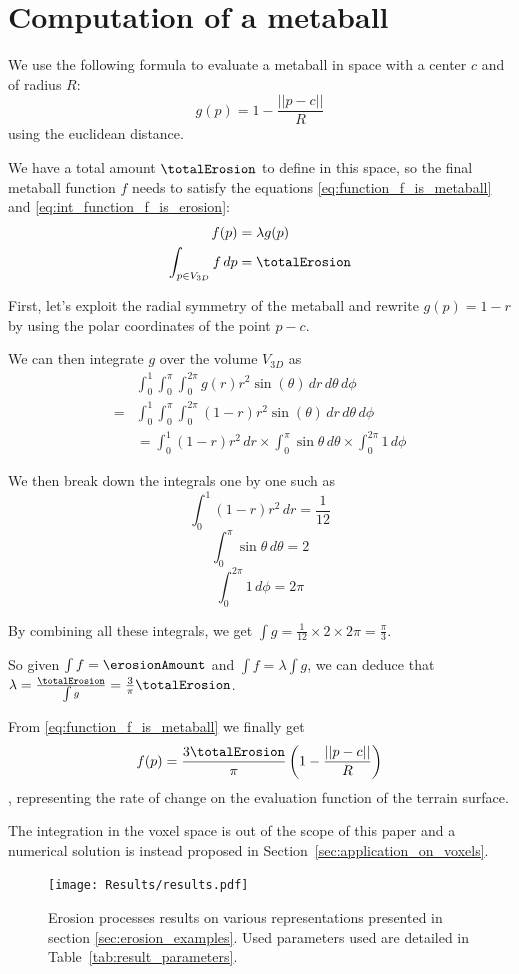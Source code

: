 %
\section{Computation of a metaball}
\label{sec:appendix_metaball}
We use the following formula to evaluate a metaball in space with a center $c$ and of radius $R$:
$$ g(p) = 1 - \frac{||p - c||}{R} $$
using the euclidean distance.

We have a total amount $\totalErosion$ to define in this space, so the final metaball function $f$ needs to satisfy the equations \eqref{eq:function_f_is_metaball} and \eqref{eq:int_function_f_is_erosion}:
\begin{align}
\label{eq:function_f_is_metaball}
f(p) &= \lambda g(p) \\
\label{eq:int_function_f_is_erosion}
\int_{p \in V_{3D}}{f \, dp} &= \totalErosion
\end{align}

First, let's exploit the radial symmetry of the metaball and rewrite $g(p) = 1 - r$ by using the polar coordinates of the point $p - c$.

We can then integrate $g$ over the volume $V_{3D}$ as 
\begin{align}
&\int_{0}^{1}{ \int_{0}^{\pi}{ \int_{0}^{2\pi}{ g(r) r^2 \sin(\theta)\, dr} \, d\theta} \, d\phi} \nonumber \\
= &\int_{0}^{1}{ \int_{0}^{\pi}{ \int_{0}^{2\pi}{ (1 - r) r^2 \sin(\theta)\, dr} \, d\theta} \, d\phi} \nonumber \\
&= \int_{0}^{1}{ (1 - r)r^2 \, dr} \times \int_{0}^{\pi}{ \sin{\theta} \, d\theta } \times \int_{0}^{2\pi}{ 1 \, d\phi} \nonumber
\end{align}

We then break down the integrals one by one such as 
$$ \int_{0}^{1}{ (1 - r)r^2 \, dr} = \frac{1}{12} \nonumber$$ 
$$ \int_{0}^{\pi}{ \sin{\theta} \, d\theta } = 2 \nonumber$$ 
$$ \int_{0}^{2\pi}{ 1 \, d\phi} = 2 \pi \nonumber$$

By combining all these integrals, we get $\int{g} = \frac{1}{12} \times 2 \times 2\pi = \frac{\pi}{3}$.

So given $\int{f} = \erosionAmount$ and $\int{f} = \lambda \int{g}$, we can deduce that $\lambda = \frac{\totalErosion}{\int{g}} = \frac{3}{\pi}\totalErosion$.

From \eqref{eq:function_f_is_metaball} we finally get 
\begin{align} 
\label{eq:proofErosionMetaball}
f(p) = \frac{3 \totalErosion}{\pi} \left(1 - \frac{||p - c||}{R} \right)
\end{align}
, representing the rate of change on the evaluation function of the terrain surface.

The integration in the voxel space is out of the scope of this paper and a numerical solution is instead proposed in Section~\ref{sec:application_on_voxels}.


\clearpage
\begin{figure}
	\centering
    \texttt{[image: Results/results.pdf]}
	\caption{Erosion processes results on various representations presented in section \ref{sec:erosion_examples}. Used parameters used are detailed in  Table~\ref{tab:result_parameters}.}
	\label{tab:result_figures}
\end{figure}
